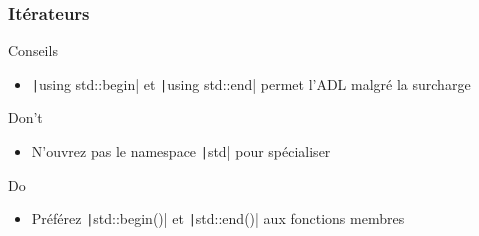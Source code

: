 \documentclass[C++.tex]{subfiles}
\begin{document}
\begin{frame}[fragile]
	\frametitle{Itérateurs}
	\begin{block}{Conseils}
		\begin{itemize}
			\item \texttt|using std::begin| et \texttt|using std::end| permet l'ADL malgré la surcharge
		\end{itemize}
	\end{block}

	\begin{alertblock}{Don't}
		\begin{itemize}
			\item N'ouvrez pas le namespace \texttt|std| pour spécialiser
		\end{itemize}
	\end{alertblock}

	\begin{exampleblock}{Do}
		\begin{itemize}
			\item Préférez \texttt|std::begin()| et \texttt|std::end()| aux fonctions membres
		\end{itemize}

	\end{exampleblock}
\end{frame}
\end{document}

